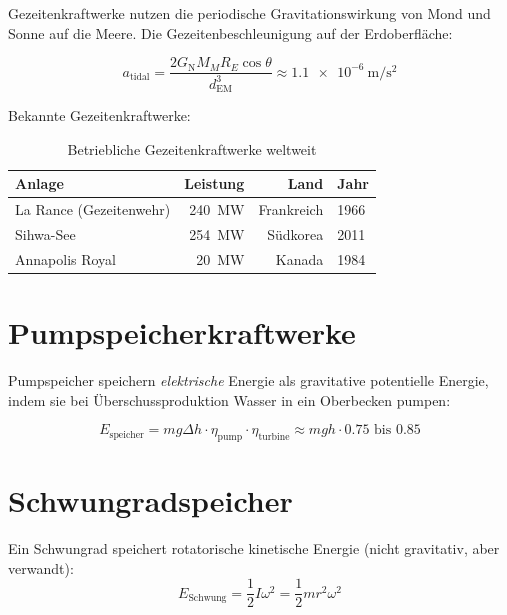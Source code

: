 ﻿\documentclass[12pt, a4paper]{report}
\theoremstyle{definition}
\theoremstyle{remark}
\newcommand{\G}{G_{\text{N}}}          %
\begin{document}
Gezeitenkraftwerke nutzen die periodische Gravitationswirkung von Mond und Sonne
auf die Meere. Die Gezeitenbeschleunigung auf der Erdoberfläche:

\begin{equation}
  a_{\text{tidal}} = \frac{2\G M_M R_E \cos\theta}{d_{\text{EM}}^3}
  \approx \SI{1.1e-6}{\metre\per\second\squared}
  \label{eq:gezeitenkraft}
\end{equation}

Bekannte Gezeitenkraftwerke:

\begin{table}[H]
  \centering
  \caption{Betriebliche Gezeitenkraftwerke weltweit}
  \label{tab:gezeiten}
  \begin{tabular}{lrrl}
    \toprule
    \textbf{Anlage} & \textbf{Leistung} & \textbf{Land} & \textbf{Jahr} \\
    \midrule
    La Rance (Gezeitenwehr) & \SI{240}{\mega\watt} & Frankreich & 1966 \\
    Sihwa-See              & \SI{254}{\mega\watt} & Südkorea   & 2011 \\
    Annapolis Royal        & \SI{20}{\mega\watt}  & Kanada     & 1984 \\
    \bottomrule
  \end{tabular}
\end{table}

\section{Pumpspeicherkraftwerke}

Pumpspeicher speichern \emph{elektrische} Energie als gravitative potentielle
Energie, indem sie bei Überschussproduktion Wasser in ein Oberbecken pumpen:

\begin{equation}
  E_{\text{speicher}} = mg\Delta h \cdot \eta_{\text{pump}} \cdot \eta_{\text{turbine}}
  \approx mgh \cdot 0.75 \text{ bis } 0.85
  \label{eq:pumpspeicher}
\end{equation}

\section{Schwungradspeicher}

Ein Schwungrad speichert rotatorische kinetische Energie (nicht gravitativ, aber verwandt):
\begin{equation}
  E_{\text{Schwung}} = \frac{1}{2}I\omega^2 = \frac{1}{2}mr^2\omega^2
  \label{eq:schwungrad}
\end{equation}
\end{document}
